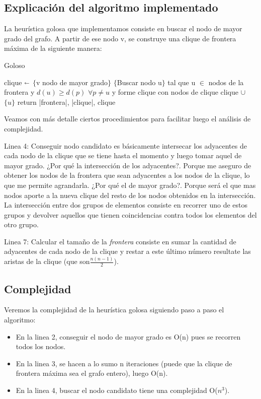 \subsection{Explicación del algoritmo implementado}
La heurística golosa que implementamos consiste en buscar el nodo de mayor grado del grafo. A partir de ese nodo v, se construye una clique de frontera máxima de la siguiente manera:

\begin{algorithm}[H]
\caption{Goloso}\label{ej2}
\begin{algorithmic}[1]
	\State clique  $\shortleftarrow$ $\{$v nodo de mayor grado$\}$
		\State $\{$Buscar nodo u$\}$ tal que u $\in$ nodos de la frontera y $ d(u) \ge d(p)$ $ \forall p \neq u $ y forme clique con nodos de clique
		\State clique $\cup$ $\{u\}$
	\EndWhile
	\State return |frontera|, |clique|, clique 
\EndProcedure
\end{algorithmic}
\end{algorithm}
Veamos con más detalle ciertos procedimientos para facilitar luego el análisis de complejidad.

Linea 4: Conseguir nodo candidato es básicamente intersecar los adyacentes de cada nodo de la clique que se tiene hasta el momento y luego tomar aquel de mayor grado. ¿Por qué la intersección de los adyacentes?. Porque me aseguro de obtener los nodos de la frontera que sean adyacentes a los nodos de la clique, lo que me permite agrandarla.
¿Por qué el de mayor grado?. Porque será el que mas nodos aporte a la nueva clique del resto de los nodos obtenidos en la intersección.
La intersección entre dos grupos de elementos consiste en recorrer uno de estos grupos y devolver aquellos que tienen coincidencias contra todos los elementos del otro grupo.

Linea 7: Calcular el tamaño de la \textit{frontera} consiste en sumar la cantidad de adyacentes de cada nodo de la clique y restar a este último número resultate las aristas de la clique (que son$ \displaystyle\frac{n(n-1)}{2}$).  


\subsection{Complejidad}
Veremos la complejidad de la heurística golosa siguiendo paso a paso el algoritmo:
\begin{itemize}
 \item En la linea 2, conseguir el nodo de mayor grado es O(n) pues se recorren todos los nodos.
 \item En la linea 3, se hacen a lo sumo n iteraciones (puede que la clique de frontera máxima sea el grafo entero), luego O(n).
 \item En la linea 4, buscar el nodo candidato tiene una complejidad O($n^{3}$).
\end{itemize}

